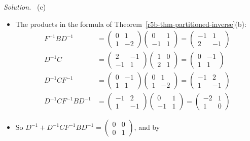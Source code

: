 \documentclass[12pt]{article}
\theoremstyle{definition}
\newenvironment{solution}{\par\noindent\textit{Solution.}\ }{\par\smallskip}
\begin{document}
\begin{solution}
(c)
\begin{itemize}
\item The products in the formula of Theorem~\ref{r5b-thm-partitioned-inverse}(b):
\[
\begin{aligned}
F^{-1}BD^{-1}&=\begin{pmatrix}0&1\\1&-2\end{pmatrix}\begin{pmatrix}0&1\\-1&1\end{pmatrix}=\begin{pmatrix}-1&1\\2&-1\end{pmatrix}\\
D^{-1}C&=\begin{pmatrix}2&-1\\-1&1\end{pmatrix}\begin{pmatrix}1&0\\2&1\end{pmatrix}=\begin{pmatrix}0&-1\\1&1\end{pmatrix}\\
D^{-1}CF^{-1}&=\begin{pmatrix}0&-1\\1&1\end{pmatrix}\begin{pmatrix}0&1\\1&-2\end{pmatrix}=\begin{pmatrix}-1&2\\1&-1\end{pmatrix}\\
D^{-1}CF^{-1}BD^{-1}&=\begin{pmatrix}-1&2\\1&-1\end{pmatrix}\begin{pmatrix}0&1\\-1&1\end{pmatrix}=\begin{pmatrix}-2&1\\1&0\end{pmatrix}
\end{aligned}
\]
\item So \(D^{-1}+D^{-1}CF^{-1}BD^{-1}=\left(\begin{smallmatrix}0&0\\0&1\end{smallmatrix}\right)\), and by

\end{itemize}
\end{solution}
\end{document}
